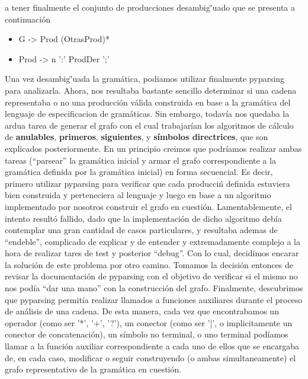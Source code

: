 \documentclass[a4paper]{report}
\begin{document}
a tener finalmente el conjunto de producciones desambig\"'uado que se presenta a continuaci\'on

\begin{itemize}
	\item G 		-> Prod (OtrasProd)*
	\item Prod 	-> n ':' ProdDer ';'
	
\end{itemize}

Una vez desambig\"'uada la gram\'atica, podiamos utilizar finalmente pyparsing para analizarla. Ahora, nos resultaba bastante sencillo determinar si una cadena representaba o no una producci\'on v\'alida construida en base a la gram\'atica del lenguaje de especificacion de gram\'aticas. Sin embargo, todav\'ia nos quedaba la ardua tarea de generar el grafo con el cual trabajar\'ian los algoritmos de c\'alculo de \textbf{anulables}, \textbf{primeros}, \textbf{siguientes}, y \textbf{s\'imbolos directrices}, que son explicados posteriormente. En un principio creimos que podr\'iamos realizar ambas tareas ("`parsear"' la gram\'atica inicial y armar el grafo correspondiente a la gram\'atica definida por la gram\'atica inicial) en forma secuencial. Es decir, primero utilizar pyparsing para verificar que cada producci\'n definida estuviera bien construida y perteneciera al lenguaje y luego en base a un algoritmo implementado por nosotros construir el grafo en cuesti\'on. Lamentablemente, el intento result\'o fallido, dado que la implementaci\'on de dicho algoritmo deb\'ia contemplar una gran cantidad de casos particulares, y resultaba ademas de "`endeble"', complicado de explicar y de entender y extremadamente complejo a la hora de realizar tares de test y posterior "`debug"'. Con lo cual, decidimos encarar la soluci\'on de este problema por otro camino. Tomamos la decisi\'on entonces de revisar la documentaci\'on de pyparsing con el objetivo de verificar si el mismo no nos pod\'ia "`dar una mano"' con la construcci\'on del grafo. Finalmente, descubrimos que pyparsing permit\'ia realizar llamados a funciones auxiliares durante el proceso de an\'alisis de una cadena. De esta manera, cada vez que encontrabamos un operador (como ser '*', '+', '?'), un conector (como ser '|', o implicitamente un conector de concatenaci\'on), un s\'imbolo no terminal, o uno terminal pod\'iamos llamar a la funci\'on auxiliar correspondiente a cada uno de ellos que se encargaba de, en cada caso, modificar o seguir construyendo (o ambas simultaneamente) el grafo representativo de la gram\'atica en cuesti\'on.
\end{document}
